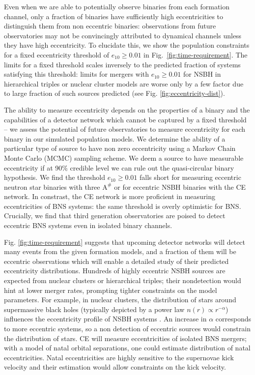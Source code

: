 \documentclass[floatfix,lengthcheck,showpacs,amssymb,amsmath,amsfonts,twocolumn,nofootinbib,longbibliography]{revtex4-1}
\begin{document}
Even when we are able to potentially observe binaries from each formation channel, only a fraction of binaries have sufficiently high eccentricities to distinguish them from non eccentric binaries: observations from future observatories may not be convincingly attributed to dynamical channels unless they have high eccentricity. To elucidate this, we show the population constraints for a fixed eccentricity threshold of $e_{10} \geq 0.01$ in Fig.~\ref{fig:time-requirement}. The limits for a fixed threshold scales inversely to the predicted fraction of systems satisfying this threshold: limits for mergers with $e_{10} \geq 0.01$ for NSBH in hierarchical triples or nuclear cluster models are worse only by a few factor due to large fraction of such sources predicted (see Fig. \ref{fig:eccentricity-dist}). 

The ability to measure eccentricity depends on the properties of a binary and the  \cite{Lower:2018seu} capabilities of a detector network which cannot be captured by a fixed threshold -- we assess the potential of future observatories to measure eccentricity for each binary in our simulated population models. We determine the ability of a particular type of source to have non zero eccentricity using a Markov Chain Monte Carlo (MCMC) sampling scheme. We deem a source to have measurable eccentricity if at 90\% credible level we can rule out the quasi-circular binary hypothesis. We find the threshold $e_{10} \geq 0.01$ falls short for measuring eccentric neutron star binaries with three $\text{A}^{\#}$ or for eccentric NSBH binaries with the CE network. In constrast, the CE network is more proficient in measuring eccentricities of BNS systems: the same threshold is overly optimistic for BNS.  Crucially, we find that third generation observatories are poised to detect eccentric BNS systems even in isolated binary channels.

Fig. \ref{fig:time-requirement} suggests that upcoming detector networks will detect many events from the given formation models, and a fraction of them will be eccentric observations which will enable a detailed study of their predicted eccentricity distributions. Hundreds of highly eccentric NSBH sources are expected from nuclear clusters or hierarchical triples; their nondetection would hint at lower merger rates, prompting tighter constraints on the model parameters. For example, in nuclear clusters, the distribution of stars around supermassive black holes (typically depicted by a power law $n(r) \propto r^{-\alpha}$) influences the eccentricity profile of NSBH systems \cite{Fragione:2018yrb}. An increase in $\alpha$ corresponds to more eccentric systems, so a non detection of eccentric sources would constrain the distribution of stars. CE will measure eccentricities of isolated BNS mergers; with a model of natal orbital separations, one could estimate distribution of natal eccentricities. Natal eccentricities are highly sensitive to the supernovae kick velocity \cite{Hobbs:2005yx, Richards:2022fnq} and their estimation would allow constraints on the kick velocity.
\end{document}
